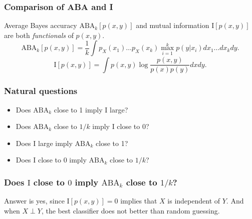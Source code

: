 \documentclass{beamer}
\begin{document}
\begin{frame}
\frametitle{Comparison of ABA and I}
Average Bayes accuracy $\text{ABA}_k[p(x, y)]$ and mutual information $\text{I}[p(x, y)]$ are both \emph{functionals} of $p(x, y)$.
\[
\text{ABA}_k[p(x, y)] = \frac{1}{k} \int p_X(x_1)\hdots p_X(x_k) \max_{i=1}^k p(y|x_i)  dx_1\hdots dx_k dy.
\]
\[
\text{I}[p(x, y)] = \int p(x, y) \log \frac{p(x, y)}{p(x)p(y)} dx dy.
\]
\end{frame}

\begin{frame}
\frametitle{Natural questions}
\begin{itemize}
\item Does $\text{ABA}_k$ close to 1 imply $\text{I}$ large?
\item Does $\text{ABA}_k$ close to $1/k$ imply $\text{I}$ close to 0?
\item Does $\text{I}$ large imply $\text{ABA}_k$ close to 1?
\item Does $\text{I}$ close to $0$ imply $\text{ABA}_k$ close to $1/k$?
\end{itemize}
\end{frame}

\begin{frame}
\frametitle{Does $\text{I}$ close to $0$ imply $\text{ABA}_k$ close to $1/k$?}
Answer is yes, since $\text{I}[p(x, y)] = 0$ implies that $X$ is independent of $Y$.
And when $X \perp Y$, the best classifier does not better than random guessing.
\end{frame}
\end{document}
